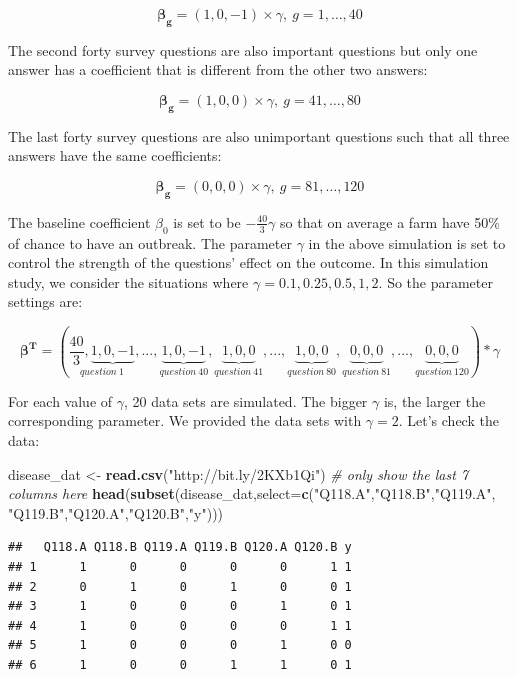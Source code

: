 \documentclass[12pt,]{krantz}
\makeatletter
\newenvironment{Shaded}{\begin{snugshade}}{\end{snugshade}}
\newcommand{\CommentTok}[1]{\textcolor[rgb]{0.37,0.37,0.37}{\textit{#1}}}
\newcommand{\DataTypeTok}[1]{\textcolor[rgb]{0.27,0.27,0.27}{#1}}
\newcommand{\KeywordTok}[1]{\textcolor[rgb]{0.27,0.27,0.27}{\textbf{#1}}}
\newcommand{\NormalTok}[1]{#1}
\newcommand{\StringTok}[1]{\textcolor[rgb]{0.5,0.5,0.5}{#1}}
\newenvironment{kframe}{%
\medskip{}
\setlength{\fboxsep}{.8em}
 \def\at@end@of@kframe{}%
 \ifinner\ifhmode%
  \def\at@end@of@kframe{\end{minipage}}%
  \begin{minipage}{\columnwidth}%
 \fi\fi%
 \def\FrameCommand##1{\hskip\@totalleftmargin \hskip-\fboxsep
 \colorbox{shadecolor}{##1}\hskip-\fboxsep
     \hskip-\linewidth \hskip-\@totalleftmargin \hskip\columnwidth}%
 \MakeFramed {\advance\hsize-\width
   \@totalleftmargin\z@ \linewidth\hsize
   \@setminipage}}%
 {\par\unskip\endMakeFramed%
 \at@end@of@kframe}
\renewenvironment{Shaded}{\begin{kframe}}{\end{kframe}}
\makeatother
\begin{document}
\[\mathbf{\beta_g}=(1,0,-1)\times \gamma,\ g=1,\dots,40\]

The second forty survey questions are also important questions but only one answer has a coefficient that is different from the other two answers:

\[\mathbf{\beta_g}=(1,0,0)\times \gamma,\ g=41,\dots,80\]

The last forty survey questions are also unimportant questions such that all three answers have the same coefficients:

\[\mathbf{\beta_g}=(0,0,0)\times \gamma,\ g=81,\dots,120\]

The baseline coefficient \(\beta_0\) is set to be \(-\frac{40}{3}\gamma\) so that on average a farm have 50\% of chance to have an outbreak. The parameter \(\gamma\) in the above simulation is set to control the strength of the questions' effect on the outcome. In this simulation study, we consider the situations where \(\gamma = 0.1, 0.25, 0.5, 1, 2\). So the parameter settings are:

\[\mathbf{\beta^{T}}=\left(\underset{question\ 1}{\frac{40}{3},\underbrace{1,0,-1}},...,\underset{question\ 40}{\underbrace{1,0,-1}},\underset{question\ 41}{\underbrace{1,0,0}},...,\underset{question\ 80}{\underbrace{1,0,0}},\underset{question\ 81}{\underbrace{0,0,0}},...,\underset{question\ 120}{\underbrace{0,0,0}}\right)*\gamma\]

For each value of \(\gamma\), 20 data sets are simulated. The bigger \(\gamma\) is, the larger the corresponding parameter. We provided the data sets with \(\gamma = 2\). Let's check the data:

\begin{Shaded}
\begin{Highlighting}[]
\NormalTok{disease_dat <-}\StringTok{ }\KeywordTok{read.csv}\NormalTok{(}\StringTok{"http://bit.ly/2KXb1Qi"}\NormalTok{)}
\CommentTok{# only show the last 7 columns here}
\KeywordTok{head}\NormalTok{(}\KeywordTok{subset}\NormalTok{(disease_dat,}\DataTypeTok{select=}\KeywordTok{c}\NormalTok{(}\StringTok{"Q118.A"}\NormalTok{,}\StringTok{"Q118.B"}\NormalTok{,}\StringTok{"Q119.A"}\NormalTok{,}
                                 \StringTok{"Q119.B"}\NormalTok{,}\StringTok{"Q120.A"}\NormalTok{,}\StringTok{"Q120.B"}\NormalTok{,}\StringTok{"y"}\NormalTok{))) }
\end{Highlighting}
\end{Shaded}

\begin{verbatim}
##   Q118.A Q118.B Q119.A Q119.B Q120.A Q120.B y
## 1      1      0      0      0      0      1 1
## 2      0      1      0      1      0      0 1
## 3      1      0      0      0      1      0 1
## 4      1      0      0      0      0      1 1
## 5      1      0      0      0      1      0 0
## 6      1      0      0      1      1      0 1
\end{verbatim}
\end{document}
